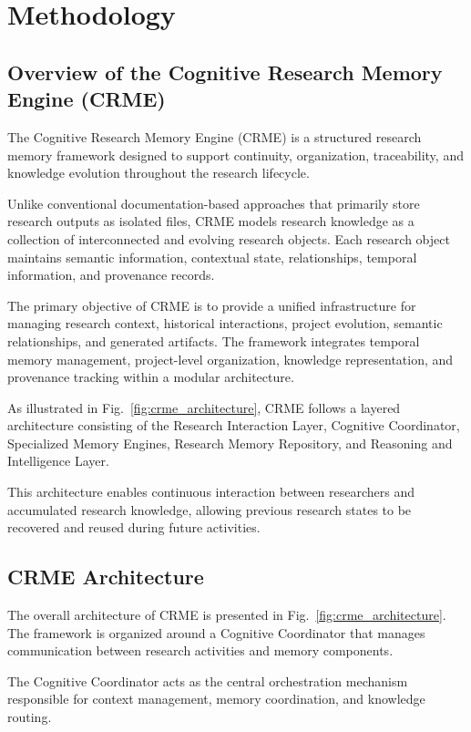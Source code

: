 \section{Methodology}
\label{sec:methodology}

\subsection{Overview of the Cognitive Research Memory Engine (CRME)}

The Cognitive Research Memory Engine (CRME) is a structured research memory framework designed to support continuity, organization, traceability, and knowledge evolution throughout the research lifecycle.

Unlike conventional documentation-based approaches that primarily store research outputs as isolated files, CRME models research knowledge as a collection of interconnected and evolving research objects. Each research object maintains semantic information, contextual state, relationships, temporal information, and provenance records.

The primary objective of CRME is to provide a unified infrastructure for managing research context, historical interactions, project evolution, semantic relationships, and generated artifacts. The framework integrates temporal memory management, project-level organization, knowledge representation, and provenance tracking within a modular architecture.

As illustrated in Fig.~\ref{fig:crme_architecture}, CRME follows a layered architecture consisting of the Research Interaction Layer, Cognitive Coordinator, Specialized Memory Engines, Research Memory Repository, and Reasoning and Intelligence Layer.

This architecture enables continuous interaction between researchers and accumulated research knowledge, allowing previous research states to be recovered and reused during future activities.


\subsection{CRME Architecture}

The overall architecture of CRME is presented in Fig.~\ref{fig:crme_architecture}. The framework is organized around a Cognitive Coordinator that manages communication between research activities and memory components.

The Cognitive Coordinator acts as the central orchestration mechanism responsible for context management, memory coordination, and knowledge routing.


